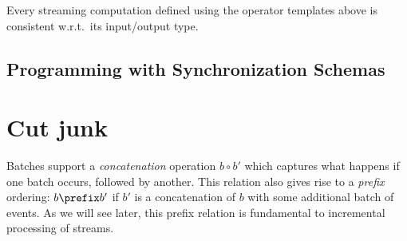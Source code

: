 \begin{theorem}
\normalfont
Every streaming computation defined using the operator templates above is consistent w.r.t.\ its input/output type.
\end{theorem}

\section{Programming with Synchronization Schemas}

\chapter{Cut junk}

Batches support a \emph{concatenation} operation $b \circ b'$ which captures what happens if one batch occurs, followed by another.
This relation also gives rise to a \emph{prefix} ordering: $b \prefix b'$ if $b'$ is a concatenation of $b$ with some additional batch of events.
As we will see later, this prefix relation is fundamental to incremental processing of streams.


